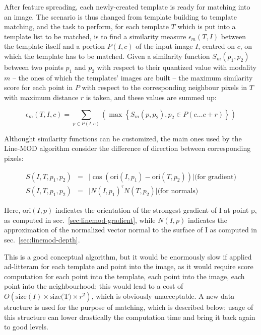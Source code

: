 After feature spreading, each newly-created template is ready for
matching into an image. The scenario is thus changed from template
building to template matching, and the task to perform, for each
template $T$ which is put into a template list to be matched, is to
find a similarity measure $\epsilon_m (T,I)$ between the template itself
and a portion $P(I,c)$ of
the input image $I$, centred on $c$, on which the template has to be matched. Given a
similarity function $S_m(p_1, p_2)$ between two points $p_1$ and $p_2$
with respect to their quantized value with modality $m$ -- the ones
of which the templates' images are built -- the maximum similarity
score for each point in $P$ with respect to the corresponding
neighbour pixels in $T$ with maximum distance $r$ is taken, and these values are summed up:

\begin{equation} \label{eqn:similarity-function}
  \epsilon_m (T,I,c)=\sum_{p\in P(I,c)} { \left( \max \left\{ S_m
      (p,p_2) , p_2 \in P(c\dots c+r) \right\} \right) }
\end{equation}

Althought similarity functions can be customized, the main ones used
by the Line-MOD algorithm consider the difference of direction between
corresponding pixels:

\begin{eqnarray}
  S(I,T,p_1,p_2) & = & \lvert \cos(\text{ori}(I,p_1) -
  \text{ori}(T,p_2)) \rvert \text{(for gradient)} \\
  S(I,T,p_1,p_2) & = & \lvert N(I,p_1)^{\tau} N(T,p_2)\rvert \text{(for normals)}
\end{eqnarray}

Here, $\text{ori}(I,p)$ indicates the orientation of the strongest
gradient of I at point p, as computed in
sec.~\ref{sec:linemod-gradient}, while $N(I,p)$ indicates the
approximation of the normalized vector normal to the surface of I as
computed in sec.~\ref{sec:linemod-depth}.

This is a good conceptual algorithm, but it would be enormously slow
if applied ad-litteram for each template and point into the image, as
it would require score computation for each point into the template,
each point into the image, each point into the neighbourhood; this
would lead to a cost of $O(\text{size}(I)\times \text{size(T)}\times
r^2)$, which is obviously unacceptable. A new data structure is used for
the purpose of matching, which is described below; usage of this
structure can lower drastically the computation time and bring it back
again to good levels.

